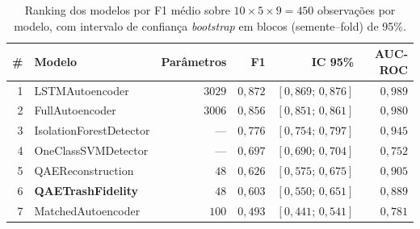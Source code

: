 \begin{table}[h!]
\centering
\caption{Ranking dos modelos por F1 médio sobre $10 \times 5 \times 9 = 450$ observações por modelo, com intervalo de confiança \textit{bootstrap} em blocos (semente--fold) de 95\%.}
\label{tab:ranking}
\begin{tabular}{rlrrrr}
\toprule
\textbf{\#} & \textbf{Modelo} & \textbf{Parâmetros} & \textbf{F1} & \textbf{IC 95\%} & \textbf{AUC-ROC} \\
\midrule
1 & LSTMAutoencoder & $3029$ & $0,872$ & $[0,869;\, 0,876]$ & $0,989$ \\
2 & FullAutoencoder & $3006$ & $0,856$ & $[0,851;\, 0,861]$ & $0,980$ \\
3 & IsolationForestDetector & --- & $0,776$ & $[0,754;\, 0,797]$ & $0,945$ \\
4 & OneClassSVMDetector & --- & $0,697$ & $[0,690;\, 0,704]$ & $0,752$ \\
5 & QAEReconstruction & $48$ & $0,626$ & $[0,575;\, 0,675]$ & $0,905$ \\
6 & \textbf{QAETrashFidelity} & $48$ & $0,603$ & $[0,550;\, 0,651]$ & $0,889$ \\
7 & MatchedAutoencoder & $100$ & $0,493$ & $[0,441;\, 0,541]$ & $0,781$ \\
\bottomrule
\end{tabular}
\end{table}
